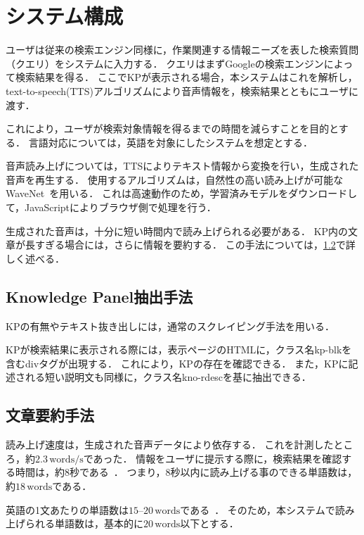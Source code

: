 \documentclass[pdflatex,ja=standard]{bxjsarticle}
\begin{document}
\section{システム構成}

ユーザは従来の検索エンジン同様に，作業関連する情報ニーズを表した検索質問（クエリ）をシステムに入力する．
クエリはまずGoogleの検索エンジンによって検索結果を得る．
ここでKPが表示される場合，本システムはこれを解析し，text-to-speech(TTS)アルゴリズムにより音声情報を，検索結果とともにユーザに渡す．

これにより，ユーザが検索対象情報を得るまでの時間を減らすことを目的とする．
言語対応については，英語を対象にしたシステムを想定とする．

音声読み上げについては，TTSによりテキスト情報から変換を行い，生成された音声を再生する．
使用するアルゴリズムは，自然性の高い読み上げが可能なWaveNet~\cite{Oord2016}を用いる．
これは高速動作のため，学習済みモデルをダウンロードして，JavaScriptによりブラウザ側で処理を行う．

生成された音声は，十分に短い時間内で読み上げられる必要がある．
KP内の文章が長すぎる場合には，さらに情報を要約する．
この手法については，\ref{sec:summarize}で詳しく述べる．

\subsection{Knowledge Panel抽出手法}

KPの有無やテキスト抜き出しには，通常のスクレイピング手法を用いる．

KPが検索結果に表示される際には，表示ページのHTMLに，クラス名\textrm{kp-blk}を含むdivタグが出現する．
これにより，KPの存在を確認できる．
また，KPに記述される短い説明文も同様に，クラス名\textrm{kno-rdesc}を基に抽出できる．

\subsection{文章要約手法} \label{sec:summarize}

読み上げ速度は，生成された音声データにより依存する．
これを計測したところ，約$2.3\,\mathrm{words/s}$であった．
情報をユーザに提示する際に，検索結果を確認する時間は，約8秒である~\cite{Granka2004}．
つまり，8秒以内に読み上げる事のできる単語数は，約$18\,\mathrm{words}$である．

英語の1文あたりの単語数は$15$--$20\,\mathrm{words}$である~\cite{Mesa}．
そのため，本システムで読み上げられる単語数は，基本的に$20\,\mathrm{words}$以下とする．
\end{document}
